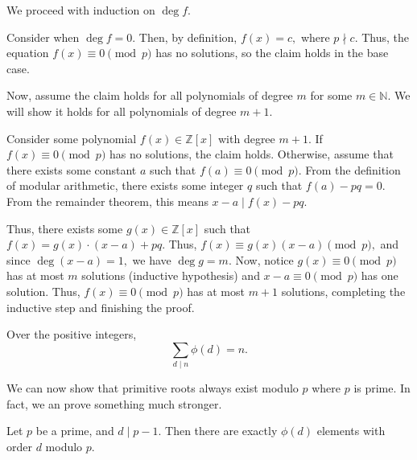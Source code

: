\documentclass[blue,onecol]{shooting}
\begin{document}
\begin{pro}
We proceed with induction on $\operatorname{deg} f.$

Consider when $\operatorname{deg} f=0.$ Then, by definition, $f(x) = c,$ where $p \nmid c.$ Thus, the equation $f(x) \equiv 0 \pmod{p}$ has no solutions, so the claim holds in the base case.

Now, assume the claim holds for all polynomials of degree $m$ for some $m \in \mathbb{N}.$ We will show it holds for all polynomials of degree $m+1.$

Consider some polynomial $f(x) \in \mathbb{Z}[x]$ with degree $m+1.$ If $f(x) \equiv 0 \pmod{p}$ has no solutions, the claim holds. Otherwise, assume that there exists some constant $a$ such that $f(a) \equiv 0 \pmod{p}.$ From the definition of modular arithmetic, there exists some integer $q$ such that $f(a) - pq = 0.$ From the remainder theorem, this means $x-a \mid f(x)-pq.$

Thus, there exists some $g(x) \in \mathbb{Z}[x]$ such that $f(x) = g(x) \cdot (x-a) + pq.$ Thus, $f(x) \equiv g(x)(x-a) \pmod{p},$ and since $\operatorname{deg} (x-a) = 1,$ we have $\operatorname{deg} g = m.$ Now, notice $g(x) \equiv 0 \pmod{p}$ has at most $m$ solutions (inductive hypothesis) and $x-a \equiv 0 \pmod{p}$ has one solution. Thus, $f(x) \equiv 0 \pmod{p}$ has at most $m+1$ solutions, completing the inductive step and finishing the proof.
\end{pro}

\begin{fact}
Over the positive integers,
$$\sum_{d \mid n} \phi(d) = n.$$
\end{fact}
We can now show that primitive roots always exist modulo $p$ where $p$ is prime. In fact, we an prove something much stronger.

\begin{theo}
Let $p$ be a prime, and $d \mid p-1.$ Then there are exactly $\phi(d)$ elements with order $d$ modulo $p.$
\end{theo}
\end{document}
